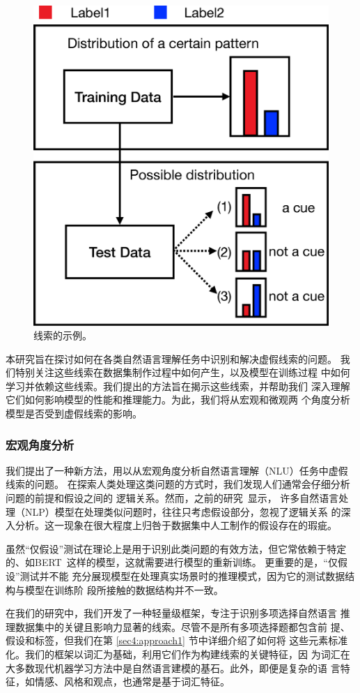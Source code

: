 \begin{figure}[th]
\centering
\includegraphics[width=0.50\columnwidth]{figures/emnlp/cue_def.eps}
\caption{线索的示例。}
\label{fig4:cue_def}
\end{figure}


本研究旨在探讨如何在各类自然语言理解任务中识别和解决虚假线索的问题。
我们特别关注这些线索在数据集制作过程中如何产生，以及模型在训练过程
中如何学习并依赖这些线索。我们提出的方法旨在揭示这些线索，并帮助我们
深入理解它们如何影响模型的性能和推理能力。为此，我们将从宏观和微观两
个角度分析模型是否受到虚假线索的影响。

\subsubsection*{宏观角度分析}
我们提出了一种新方法，用以从宏观角度分析自然语言理解（NLU）任务中虚假线索的问题。
在探索人类处理这类问题的方式时，我们发现人们通常会仔细分析问题的前提和假设之间的
逻辑关系。然而，之前的研究~\cite{naik2018stress,schuster2019towards}显示，
许多自然语言处理（NLP）模型在处理类似问题时，往往只考虑假设部分，忽视了逻辑关系
的深入分析。这一现象在很大程度上归咎于数据集中人工制作的假设存在的瑕疵。

虽然``仅假设''测试在理论上是用于识别此类问题的有效方法，但它常依赖于特定
的、如BERT~\cite{devlin2018bert}这样的模型，这就需要进行模型的重新训练。
更重要的是，``仅假设''测试并不能
充分展现模型在处理真实场景时的推理模式，因为它的测试数据结构与模型在训练阶
段所接触的数据结构并不一致。

在我们的研究中，我们开发了一种轻量级框架，专注于识别多项选择自然语言
推理数据集中的关键且影响力显著的线索。尽管不是所有多项选择题都包含前
提、假设和标签，但我们在第 \ref{sec4:approach1} 节中详细介绍了如何将
这些元素标准化。我们的框架以词汇为基础，利用它们作为构建线索的关键特征，因
为词汇在大多数现代机器学习方法中是自然语言建模的基石。此外，即便是复杂的语
言特征，如情感、风格和观点，也通常是基于词汇特征。

